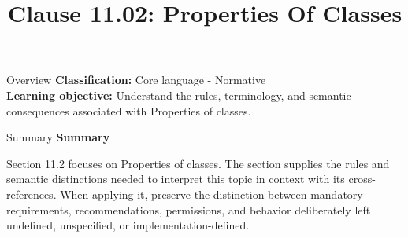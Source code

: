 \documentclass[10pt,letterpaper]{article}
\title{Clause 11.02: Properties Of Classes}
\author{}
\date{}
\begin{document}
\maketitle
\begin{CornellOverviewBox}{Overview}
\textbf{Classification:} Core language - Normative\\[2pt]
\textbf{Learning objective:} Understand the rules, terminology, and semantic consequences associated with Properties of classes.
\end{CornellOverviewBox}\begin{CornellSummaryBox}{Summary}
{\sffamily\bfseries\color{Accent} Summary}\par\vspace{3pt}Section 11.2 focuses on Properties of classes. The section supplies the rules and semantic distinctions needed to interpret this topic in context with its cross-references. When applying it, preserve the distinction between mandatory requirements, recommendations, permissions, and behavior deliberately left undefined, unspecified, or implementation-defined.
\end{CornellSummaryBox}
\end{document}

